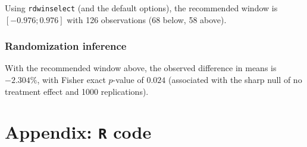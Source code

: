 \documentclass[12pt]{article}
\begin{document}
Using \verb|rdwinselect| (and the default options), the recommended window is $[-0.976;0.976]$ with 126 observations (68 below, 58 above).

\subsubsection{Randomization inference}
With the recommended window above, the observed difference in means is $-2.304\%$, with Fisher exact $p$-value of $0.024$ (associated with the sharp null of no treatment effect and 1000 replications).


\newpage


\section{Appendix: \texttt{R} code}
\end{document}
